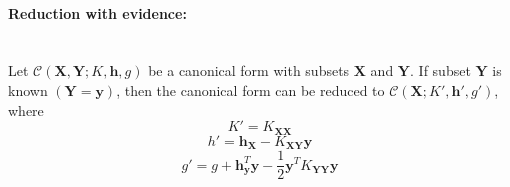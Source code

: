 \documentclass[12pt,oneside,openany,a4paper, %
afrikaans,english,
]{memoir}
\numberwithin{equation}{chapter}
\begin{document}
\paragraph{Reduction with evidence:}\mbox{}\\
Let $\mathcal{C}(\bm{X},\bm{Y};K,\bm{h},g)$ be a canonical form with subsets $\bm{X}$ and $\bm{Y}$. If subset $\bm{Y}$ is known $(\bm{Y} =  \bm{y})$, then the canonical form can be reduced to $\mathcal{C}(\bm{X}; K',\bm{h}',g')$, where
\begin{equation}
K' = K_{\bm{XX}}
\end{equation}
\begin{equation}
h' = \bm{h}_{\bm{X}} - K_{\bm{XY}}\bm{y}
\end{equation}
\begin{equation}
g' = g + \bm{h}_{\bm{y}}^T\bm{y} - \frac{1}{2}\bm{y}^TK_{\bm{YY}}\bm{y}
\end{equation}
\end{document}

